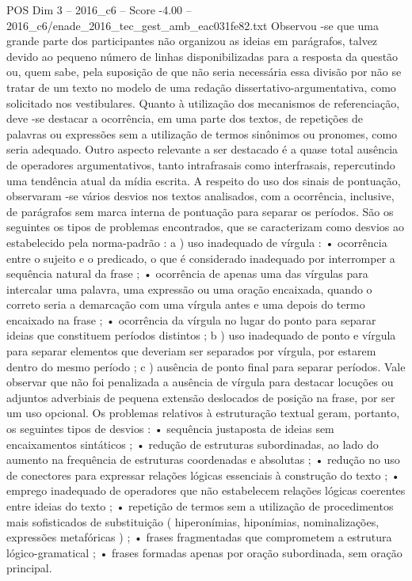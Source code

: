 \begin{textsample}{POS Dim 3 – 2016\_c6 – Score -4.00 – 2016\_c6/enade\_2016\_tec\_gest\_amb\_eac031fe82.txt}
Observou -se que uma grande parte dos participantes não organizou as ideias em parágrafos, talvez devido ao pequeno número de linhas disponibilizadas para a resposta da questão ou, quem sabe, pela suposição de que não seria necessária essa divisão por não se tratar de um texto no modelo de uma redação dissertativo-argumentativa, como solicitado nos vestibulares.
Quanto à utilização dos mecanismos de referenciação, deve -se destacar a ocorrência, em uma parte dos textos, de repetições de palavras ou expressões sem a utilização de termos sinônimos ou pronomes, como seria adequado.
Outro aspecto relevante a ser destacado é a quase total ausência de operadores argumentativos, tanto intrafrasais como interfrasais, repercutindo uma tendência atual da mídia escrita.
A respeito do uso dos sinais de pontuação, observaram -se vários desvios nos textos analisados, com a ocorrência, inclusive, de parágrafos sem marca interna de pontuação para separar os períodos.
São os seguintes os tipos de problemas encontrados, que se caracterizam como desvios ao estabelecido pela norma-padrão : a ) uso inadequado de vírgula : • ocorrência entre o sujeito e o predicado, o que é considerado inadequado por interromper a sequência natural da frase ; • ocorrência de apenas uma das vírgulas para intercalar uma palavra, uma expressão ou uma oração encaixada, quando o correto seria a demarcação com uma vírgula antes e uma depois do termo encaixado na frase ; • ocorrência da vírgula no lugar do ponto para separar ideias que constituem períodos distintos ; b ) uso inadequado de ponto e vírgula para separar elementos que deveriam ser separados por vírgula, por estarem dentro do mesmo período ; c ) ausência de ponto final para separar períodos.
Vale observar que não foi penalizada a ausência de vírgula para destacar locuções ou adjuntos adverbiais de pequena extensão deslocados de posição na frase, por ser um uso opcional.
Os problemas relativos à estruturação textual geram, portanto, os seguintes tipos de desvios : • sequência justaposta de ideias sem encaixamentos sintáticos ; • redução de estruturas subordinadas, ao lado do aumento na frequência de estruturas coordenadas e absolutas ; • redução no uso de conectores para expressar relações lógicas essenciais à construção do texto ; • emprego inadequado de operadores que não estabelecem relações lógicas coerentes entre ideias do texto ; • repetição de termos sem a utilização de procedimentos mais sofisticados de substituição ( hiperonímias, hiponímias, nominalizações, expressões metafóricas ) ; • frases fragmentadas que comprometem a estrutura lógico-gramatical ; • frases formadas apenas por oração subordinada, sem oração principal.

\end{textsample}
